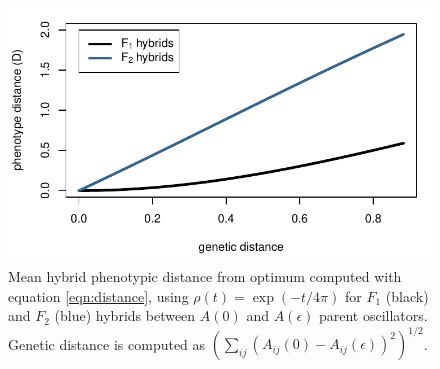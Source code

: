 \documentclass{article}
\newcommand{\1}{\mathbbm{1}}
\begin{document}
\begin{figure}[H]
    \centering
    \includegraphics{examples/fig6_small_maxt10}
    \caption{Mean hybrid phenotypic distance from optimum computed with equation \eqref{eqn:distance}, using $\rho(t) = \exp(-t/4\pi)$
    for $F_1$ (black) and $F_2$ (blue) hybrids between $A(0)$ and $A(\epsilon)$ parent oscillators. Genetic distance is computed as 
    $\left(\sum_{ij} (A_{ij}(0) - A_{ij}(\epsilon))^2\right)^{1/2}$.
    }
    \label{fig:osc_incompat}
\end{figure}
\end{document}
